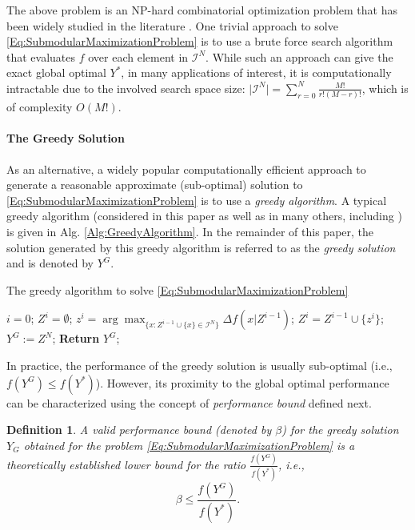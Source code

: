 \documentclass[conference]{IEEEtran}
\newtheorem{definition}{Definition}
\begin{document}
The above problem is an NP-hard combinatorial optimization problem that has been widely studied in the literature \cite{Liu2018}. One trivial approach to solve \eqref{Eq:SubmodularMaximizationProblem} is to use a brute force search algorithm that evaluates $f$ over each element in $\mathcal{I}^N$. While such an approach can give the exact global optimal $Y^*$, in many applications of interest, it is computationally intractable due to the involved search space size: $\vert \mathcal{I}^N \vert = \sum_{r=0}^N \frac{M!}{r!(M-r)!}$, which is of complexity $O(M!)$.   



\paragraph*{\textbf{The Greedy Solution}}

As an alternative, a widely popular computationally efficient approach to generate a reasonable approximate (sub-optimal) solution to \eqref{Eq:SubmodularMaximizationProblem} is to use a \emph{greedy algorithm}. A typical greedy algorithm (considered in this paper as well as in many others, including \cite{Nemhauser1978,Conforti1984,Wang2016,Liu2018}) is given in Alg. \ref{Alg:GreedyAlgorithm}. In the remainder of this paper, the solution generated by this greedy algorithm is referred to as the \emph{greedy solution} and is denoted by $Y^G$. 


\begin{algorithm}[!h]
\caption{The greedy algorithm to solve \eqref{Eq:SubmodularMaximizationProblem}}\label{Alg:GreedyAlgorithm}
\begin{algorithmic}[1]
\State $i=0$; $Z^i = \emptyset$;  
    \State $z^{i} = \arg \max_{\{x:Z^{i-1} \cup \{x\} \in \mathcal{I}^N\}} \Delta f(x \vert Z^{i-1})$;
    \State $Z^{i} = Z^{i-1} \cup \{z^{i}\}$; 
\EndFor
\State $Y^G := Z^N$;  \textbf{Return} $Y^G$;
\end{algorithmic}
\end{algorithm}


% 
In practice, the performance of the greedy solution is usually sub-optimal (i.e., $f(Y^G) \leq f(Y^*)$). However, its proximity to the global optimal performance can be characterized using the concept of \emph{performance bound} defined next. 

\begin{definition}\label{Def:PerformanceBound}
A valid \emph{performance bound} (denoted by $\beta$) for the greedy solution $Y_G$ obtained for the problem \eqref{Eq:SubmodularMaximizationProblem} is a theoretically established lower bound for the ratio $\frac{f(Y^G)}{f(Y^*)}$, i.e., 
\begin{equation}\label{Eq:Def:PerformanceBound}
    \beta \leq \frac{f(Y^G)}{f(Y^*)}.
\end{equation}
\end{definition}
\end{document}
